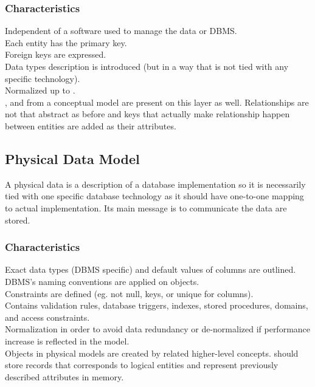 \subsubsection{Characteristics}
Independent of a software used to manage the data or DBMS. \\
Each entity has the primary key. \\
Foreign keys are expressed. \\
Data types description is introduced (but in a way that is not tied with any specific technology). \\
Normalized up to . \\

,  and  from a conceptual model are present on this layer as well. Relationships are not that abstract as before and keys that actually make relationship happen between entities are added as their attributes.

\subsection{Physical Data Model}

A physical data is a description of a database implementation so it is necessarily tied with one specific database technology as it should have one-to-one mapping to actual implementation. Its main message is to communicate  the data are stored.

\subsubsection{Characteristics}

Exact data types (DBMS specific) and default values of columns are outlined. \\
DBMS's naming conventions are applied on objects. \\
Constraints are defined (eg. not null, keys, or unique for columns). \\
Contains validation rules, database triggers, indexes, stored procedures, domains, and access constraints. \\ 
Normalization in order to avoid data redundancy or de-normalized if performance increase is reflected in the model. \\

Objects in physical models are created by related higher-level concepts.  should store records that corresponds to logical entities and  represent previously described attributes in memory.

